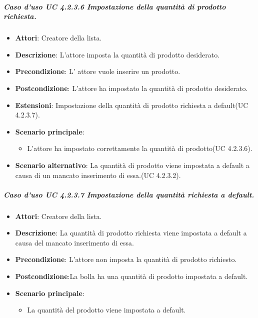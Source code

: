	\subparagraph{Caso d'uso UC 4.2.3.6 Impostazione della quantità di prodotto richiesta.}
	\begin{itemize}
		\item\textbf{Attori}: Creatore della lista.
		\item\textbf{Descrizione}: L'attore imposta la quantità di prodotto desiderato.
		\item\textbf{Precondizione}: L' attore vuole inserire un prodotto.
		\item\textbf{Postcondizione}: L'attore ha impostato la quantità di prodotto desiderato.
		\item\textbf{Estensioni}: Impostazione della quantità di prodotto richiesta a default(UC 4.2.3.7).
		\item\textbf{Scenario principale}:
			\begin{itemize}
				\item L'attore ha impostato correttamente la quantità di prodotto(UC 4.2.3.6). 
			\end{itemize}
		\item\textbf{Scenario alternativo}: La quantità di prodotto viene impostata a default a causa di un mancato inserimento di essa.(UC 4.2.3.2).
		
	\end{itemize}
	
	
	
	
	
\subparagraph{Caso d'uso UC 4.2.3.7 Impostazione della quantità richiesta a default.}
	\begin{itemize}
		\item\textbf{Attori}: Creatore della lista.
		\item\textbf{Descrizione}: La quantità di prodotto richiesta viene impostata a default a causa del mancato inserimento di essa.
		\item\textbf{Precondizione}: L'attore non imposta la quantità di prodotto richiesto.
		\item\textbf{Postcondizione}:La bolla ha una quantità di prodotto impostata a default.
		\item\textbf{Scenario principale}:
			\begin{itemize}
				\item La quantità del prodotto viene impostata a default.
			\end{itemize}
		
	\end{itemize}
	

